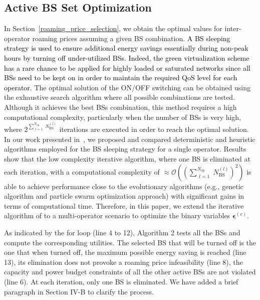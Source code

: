 \documentclass[10pt, letter, twocolumn]{IEEEtran}
\begin{document}
\subsection{Active BS Set Optimization}
\label{sec_ONOFF}
In Section~\ref{roaming_price_selection}, we obtain the optimal values for inter-operator roaming prices assuming a given BS combination. \textcolor{black}{A BS sleeping strategy is used to ensure additional energy savings essentially during non-peak hours by turning off under-utilized BSs. Indeed, the green virtualization scheme has a rare chance to be applied for highly loaded or saturated networks since all BSs need to be kept on in order to maintain the required QoS level for each operator.} The optimal solution of the ON/OFF switching can be obtained using the exhaustive search algorithm where all possible combinations are tested. Although it achieves the best BSs combination, this method requires a high computational complexity, particularly when the number of BSs is very high, where $2^{\sum_{\substack{l=1}}^{N_{\text{op}}}N_{\text{BS}}^{(l)}}$ iterations are executed in order to reach the optimal solution. In our work presented in~\cite{TVTjournal1}, we proposed and compared deterministic and heuristic algorithms employed for the BS sleeping strategy for a single operator. Results show that the low complexity iterative algorithm, where one BS is eliminated at each iteration, with a computational complexity of $\approx\mathcal{O}\left(\left({\sum_{\substack{l=1}}^{N_{\text{op}}}N_{\text{BS}}^{(l)}}\right)^2\right)$ is able to achieve performance close to the evolutionary algorithms (e.g., genetic algorithm and particle swarm optimization approach) with significant gains in terms of computational time. Therefore, in this paper, we extend the iterative algorithm of \cite{TVTjournal1} to a multi-operator scenario to optimize the binary variables $\mathbf{\epsilon}^{(c)}$.

As indicated by the for loop (line 4 to 12), Algorithm 2 tests all the BSs and compute the corresponding utilities. The selected BS that will be turned off is the one that when turned off, the maximum possible energy saving is reached (line 13), its elimination does not provoke a roaming price infeasibility (line 8), the capacity and power budget constraints of all the other active BSs are not violated (line 6). At each iteration, only one BS is eliminated. We have added a brief paragraph in Section IV-B to clarify the process.
\end{document}
